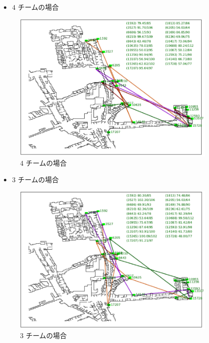 \documentclass[a4paper,12pt,fleqn]{jarticle}
\begin{document}
\begin{itemize}
\begin{itemize}
\item $4$ チームの場合\\
\end{itemize}

\begin{figure}[H]
\begin{center}
  \includegraphics[width=10cm,clip]{st43_t4_no30.pdf}
  \caption{4 チームの場合}
  \label{fig:st43_t4_no30}
  \end{center}
\end{figure}

\begin{itemize}
\item $3$ チームの場合
\end{itemize}

\begin{figure}[H]
\begin{center}
  \includegraphics[width=10cm,clip]{st43_t3_no30.pdf}
  \caption{3 チームの場合}
  \label{fig:st43_t3_no30}
  \end{center}
\end{figure}




\end{itemize}
\end{document}
